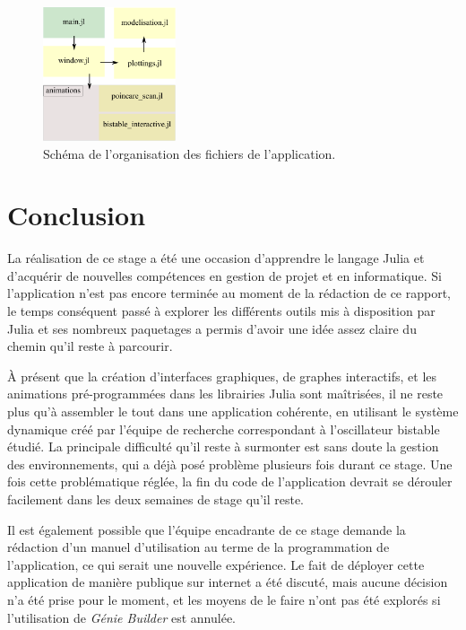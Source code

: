 \documentclass[a4paper, french, 12pt, titlepage]{article}
\begin{document}
\begin{figure}[H]
  \centering
  \includegraphics[width=0.35\textwidth]{organisation_julia.pdf}
  \caption{Schéma de l'organisation des fichiers de l'application.}
  \label{fig:orgit}
\end{figure}
\newpage

\section{Conclusion}

La réalisation de ce stage a été une occasion d'apprendre le langage Julia et d'acquérir de nouvelles compétences en gestion de projet et en informatique.
Si l'application n'est pas encore terminée au moment de la rédaction de ce rapport, le temps conséquent passé à explorer les différents outils mis à disposition par Julia et ses nombreux paquetages a permis d'avoir une idée assez claire du chemin qu'il reste à parcourir. 

À présent que la création d'interfaces graphiques, de graphes interactifs, et les animations pré-programmées dans les librairies Julia sont maîtrisées, il ne reste plus qu'à assembler le tout dans une application cohérente, en utilisant le système dynamique créé par l'équipe de recherche correspondant à l'oscillateur bistable étudié.
La principale difficulté qu'il reste à surmonter est sans doute la gestion des environnements, qui a déjà posé problème plusieurs fois durant ce stage.
Une fois cette problématique réglée, la fin du code de l'application devrait se dérouler facilement dans les deux semaines de stage qu'il reste. 

Il est également possible que l'équipe encadrante de ce stage demande la rédaction d'un manuel d'utilisation au terme de la programmation de l'application, ce qui serait une nouvelle expérience.
Le fait de déployer cette application de manière publique sur internet a été discuté, mais aucune décision n'a été prise pour le moment, et les moyens de le faire n'ont pas été explorés si l'utilisation de \emph{Génie Builder} est annulée.
\end{document}
